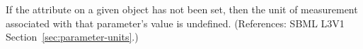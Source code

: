 If the attribute  on a given \Parameter object has not been
set, then the unit of measurement associated with that parameter's value is
undefined.  (References: SBML L3V1 Section~\ref{sec:parameter-units}.)
